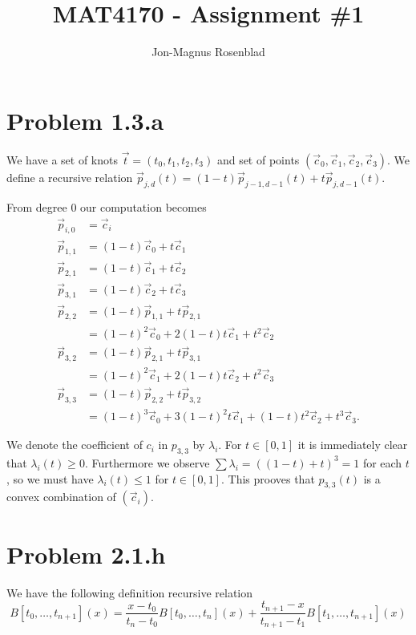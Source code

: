 \documentclass{article}
\author{Jon-Magnus Rosenblad}
\title{MAT4170 \-- Assignment \#1}
\begin{document}
\maketitle

\section*{Problem 1.3.a}

We have a set of knots $\vec t = (t_0, t_1, t_2, t_3)$
and set of points $(\vec c_0, \vec c_1, \vec c_2, \vec c_3)$.
We define a recursive relation 
$\vec p_{j,d}(t) = (1 - t) \vec p_{j - 1, d - 1}(t)
+ t \vec p_{j, d - 1}(t)$.

From degree $0$ our computation becomes
\begin{equation*}
\begin{aligned}
    \vec p_{i,0} &= \vec c_i\\
    \vec p_{1,1} &= (1 - t)\vec c_0 + t\vec c_1\\
    \vec p_{2,1} &= (1 - t)\vec c_1 + t\vec c_2\\
    \vec p_{3,1} &= (1 - t)\vec c_2 + t\vec c_3\\
    \vec p_{2,2} &= (1 - t)\vec p_{1,1} + t\vec p_{2,1}\\
    &= (1 - t)^2\vec c_0 + 2(1 - t)t\vec c_1 + t^2\vec c_2\\
    \vec p_{3,2} &= (1 - t)\vec p_{2,1} + t\vec p_{3,1}\\
    &= (1 - t)^2\vec c_1 + 2(1 - t)t\vec c_2 + t^2\vec c_3\\
    \vec p_{3,3} &= (1 - t)\vec p_{2,2} + t\vec p_{3,2}\\
    &= (1 - t)^3\vec c_0 + 3(1 - t)^2t \vec c_1
    + (1 - t)t^2\vec c_2 + t^3\vec c_3.
\end{aligned}
\end{equation*}

We denote the coefficient of $c_i$ in $p_{3,3}$ by $\lambda_i$.
For $t\in[0,1]$ it is immediately clear that $\lambda_i(t)\geq 0$.
Furthermore we observe $\sum\lambda_i = ((1 - t) + t)^3 = 1$ for each $t$,
so we must have $\lambda_i(t)\leq 1$ for $t\in [0,1]$.
This prooves that $p_{3,3}(t)$ is a convex combination of $(\vec c_i)$.

\section*{Problem 2.1.h}

We have the following definition recursive relation
\begin{equation*}
    B[t_0,\ldots, t_{n + 1}](x)
    =\frac {x - t_0}{t_n - t_0}B[t_0,\ldots,t_n](x)
    +\frac {t_{n + 1} - x}{t_{n + 1} - t_1} B[t_1,\ldots,t_{n + 1}](x)
\end{equation*}
\end{document}
